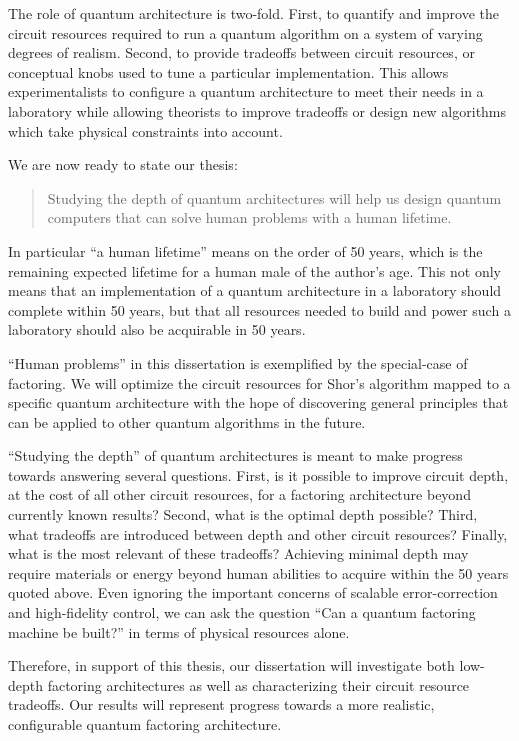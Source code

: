 The role of quantum architecture is two-fold. First,
to quantify and improve the circuit resources required to run a quantum
algorithm on a system of varying degrees of realism. Second, to provide
tradeoffs between circuit resources, or conceptual knobs used to tune a
particular implementation. This allows experimentalists to configure a
quantum architecture to meet their needs in a laboratory while allowing
theorists to improve tradeoffs or design new algorithms which take
physical constraints into account.

We are now ready to state our thesis:

\begin{quote}
Studying the depth of quantum architectures will help us design quantum
computers that can solve
human problems with a human lifetime.
\end{quote}

In particular ``a human lifetime'' means on the order of 50 years, which is
the remaining expected lifetime for a human male of the author's age.
This not only means that an implementation of a quantum architecture
in a laboratory should complete within 50 years, but that all resources
needed to build and power such a laboratory should also be acquirable in
50 years.

``Human problems'' in this dissertation is exemplified by the special-case of
factoring. We will optimize the circuit resources for Shor's algorithm mapped
to a specific quantum architecture with the hope of discovering general
principles that can be applied to other quantum algorithms in the future.

``Studying the depth'' of quantum architectures is meant to
make progress towards answering several questions.
First, is it possible to improve circuit depth, at the cost of all
other circuit resources, for a factoring architecture
beyond currently known results?
Second, what is the optimal depth possible?
Third, what tradeoffs are introduced between depth and other circuit
resources? Finally, what is the most relevant of these tradeoffs?
Achieving minimal depth may require materials or energy beyond
human abilities to acquire within the 50 years quoted above. Even ignoring the
important concerns of scalable error-correction and high-fidelity control,
we can ask the question ``Can a quantum factoring machine be built?'' in
terms of physical resources alone.

 Therefore,
in support of this thesis,
our dissertation will investigate both low-depth factoring architectures
as well as characterizing their circuit resource tradeoffs.
Our results will represent progress towards a more realistic, configurable
quantum factoring architecture.

